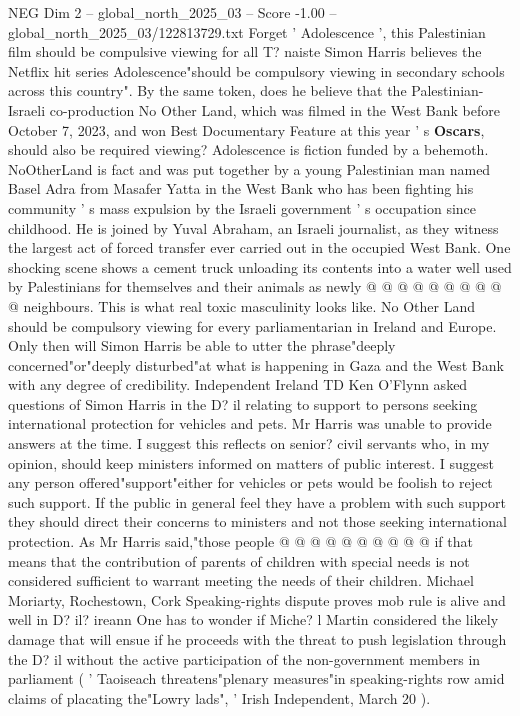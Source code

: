 \begin{textsample}{NEG Dim 2 – global\_north\_2025\_03 – Score -1.00 – global\_north\_2025\_03/122813729.txt}  \label{ex:f2_neg_029}
Forget ' Adolescence ', this Palestinian film should be compulsive viewing for all T? naiste Simon Harris believes the Netflix hit series Adolescence"should be compulsory viewing in secondary schools across this country".
By the same token, does he believe that the Palestinian-Israeli co-production No Other Land, which was filmed in the West Bank before October 7, 2023, and won Best Documentary Feature at this year ' s \textbf{Oscars}, should also be required viewing?
Adolescence is fiction funded by a behemoth.
NoOtherLand is fact and was put together by a young Palestinian man named Basel Adra from Masafer Yatta in the West Bank who has been fighting his community ' s mass expulsion by the Israeli government ' s occupation since childhood.
He is joined by Yuval Abraham, an Israeli journalist, as they witness the largest act of forced transfer ever carried out in the occupied West Bank.
One shocking scene shows a cement truck unloading its contents into a water well used by Palestinians for themselves and their animals as newly @ @ @ @ @ @ @ @ @ @ neighbours.
This is what real toxic masculinity looks like.
No Other Land should be compulsory viewing for every parliamentarian in Ireland and Europe.
Only then will Simon Harris be able to utter the phrase"deeply concerned"or"deeply disturbed"at what is happening in Gaza and the West Bank with any degree of credibility.
Independent Ireland TD Ken O'Flynn asked questions of Simon Harris in the D? il relating to support to persons seeking international protection for vehicles and pets.
Mr Harris was unable to provide answers at the time.
I suggest this reflects on senior? civil servants who, in my opinion, should keep ministers informed on matters of public interest.
I suggest any person offered"support"either for vehicles or pets would be foolish to reject such support.
If the public in general feel they have a problem with such support they should direct their concerns to ministers and not those seeking international protection.
As Mr Harris said,"those people @ @ @ @ @ @ @ @ @ @ if that means that the contribution of parents of children with special needs is not considered sufficient to warrant meeting the needs of their children.
Michael Moriarty, Rochestown, Cork Speaking-rights dispute proves mob rule is alive and well in D? il? ireann One has to wonder if Miche? l Martin considered the likely damage that will ensue if he proceeds with the threat to push legislation through the D? il without the active participation of the non-government members in parliament ( ' Taoiseach threatens"plenary measures"in speaking-rights row amid claims of placating the"Lowry lads", ' Irish Independent, March 20 ).

\end{textsample}

